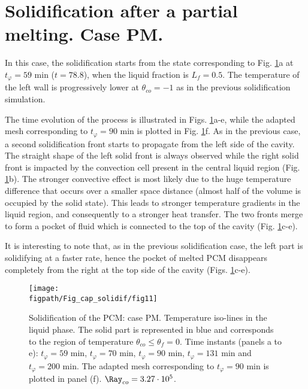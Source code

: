 \section{Solidification after a partial melting. Case PM.} \label{sec_solid_partial} 

In this case, the solidification starts from the state corresponding to Fig. \ref{fig:evolution_t80}a at $t_{\varphi} = 59$ min ($t=78.8$), when the liquid fraction is $L_f = 0.5$. 
The temperature of the left wall is progressively lower at $\theta_{co}=-1$ as in the previous solidification simulation.  

The time evolution of the process is illustrated in Figs. \ref{fig:evolution_t80}a-e, while the adapted mesh corresponding to $t_{\varphi} = 90$ min is plotted in Fig. \ref{fig:evolution_t80}f. 
As in the previous case, a second  solidification front starts to propagate from the left side of the cavity. \\
The straight shape of the left solid front is always observed while the right solid front is impacted by the convection cell present in the central liquid region (Fig. \ref{fig:evolution_t80}b). 
The stronger convective effect is most likely due to the huge temperature difference that occurs over a smaller space distance (almost half of the volume is occupied by the solid state). 
This leads to stronger temperature gradients in the liquid region, and consequently to a stronger heat transfer. 
The two fronts merge to form a pocket of fluid which is connected to the top of the cavity (Fig. \ref{fig:evolution_t80}c-e). 

It is interesting to  note that, as in the previous solidification case, the left part is solidifying at a faster rate, hence the pocket of melted PCM disappears completely from the right at the top side of the cavity (Figs. \ref{fig:evolution_t80}c-e).
\begin{figure}
	\begin{center}
		\texttt{[image: \\figpath/Fig\_cap\_solidif/fig11]}
	\end{center}
	\caption{Solidification of the PCM: case PM. Temperature iso-lines in the liquid phase. The solid part is represented in blue and corresponds to the region of temperature $\theta_{co} \leq \theta_f=0$. Time instants (panels  a to e): $t_{\varphi} = 59$ min, $t_{\varphi} = 70$ min, $t_{\varphi} = 90$ min, $t_{\varphi} = 131$ min and $t_{\varphi} = 200$ min. The adapted mesh corresponding to $t_{\varphi} = 90$ min is plotted in panel (f).  $ \Ray_{co}=3.27 \cdot 10^5$.}\label{fig:evolution_t80}
\end{figure}

